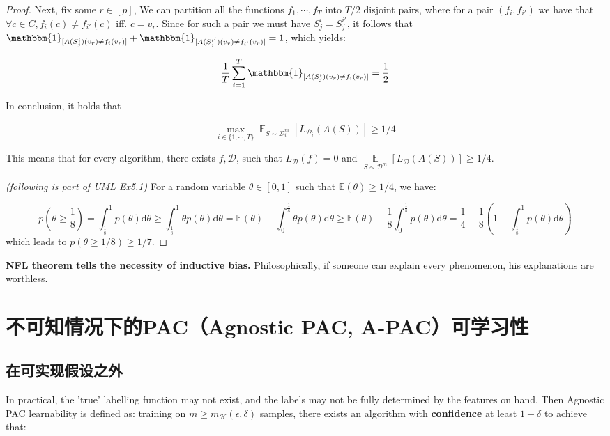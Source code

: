 \documentclass{article}
\newtheorem*{proof}{Proof}
\begin{document}
\begin{proof}
	Next, fix some $r\in[p]$, We can partition all the functions $f_1,\cdots,f_T$ into $T/2$ disjoint pairs, where for a pair $(f_i,f_{i'})$ we have that $\forall c\in C,f_i(c)\neq f_{i'}(c)$ iff. $c=v_r$. Since for such a pair we must have $S_j^i=S_j^{i'}$, it follows that $\mathbbm{1}_{[A(S_j^i)(v_r)\neq f_i(v_r)]}+\mathbbm{1}_{[A(S_j^{i'})(v_r)\neq f_{i'}(v_r)]}=1$, which yields:
	
	\begin{equation*}
	\frac{1}{T}\sum_{i=1}^T\mathbbm{1}_{[A(S_j^i)(v_r)\neq f_i(v_r)]}=\frac{1}{2}
	\end{equation*}

	In conclusion, it holds that

	\begin{equation*}
	\max_{i\in\{1,\cdots,T\}}\mathop{\mathbb{E}}_{S\sim\mathcal{D}_i^m}[L_{\mathcal{D}_i}(A(S))]\geq 1/4
	\end{equation*}

	This means that for every algorithm, there exists $f,\mathcal{D}$, such that $L_\mathcal{D}(f)=0$ and $\mathop{\mathbb{E}}\limits_{S\sim\mathcal{D}^m}[L_\mathcal{D}(A(S))]\geq 1/4$.

	\textit{(following is part of UML Ex5.1)} For a random variable $\theta\in[0,1]$ such that $\mathbb{E}(\theta)\geq 1/4$, we have:
	
	\begin{equation*}
	p\left(\theta\geq\frac{1}{8}\right)=\int_\frac{1}{8}^1 p(\theta) \mathrm{d}\theta \geq\int_\frac{1}{8}^1 \theta p(\theta) \mathrm{d}\theta=\mathbb{E}(\theta)-\int_0^\frac{1}{8}\theta p(\theta)\mathrm{d}\theta \geq\mathbb{E}(\theta)-\frac{1}{8}\int_0^\frac{1}{8} p(\theta)\mathrm{d}\theta = \frac{1}{4} - \frac{1}{8}\left( 1-\int^1_\frac{1}{8}p(\theta) \mathrm{d}\theta \right)
	\end{equation*}
which leads to $p(\theta\geq 1/8)\geq 1/7$.
	\end{proof}

	\textbf{NFL theorem tells the necessity of inductive bias.} Philosophically, if someone can explain every phenomenon, his explanations are worthless.
	
\section{不可知情况下的PAC（Agnostic PAC, A-PAC）可学习性}
	\subsection{在可实现假设之外}
	In practical, the 'true' labelling function may not exist, and the labels may not be fully determined by the features on hand. Then Agnostic PAC learnability is defined as: training on $m\geq m_\mathcal{H}(\epsilon,\delta)$ samples, there exists an algorithm with \textbf{confidence} at least $1-\delta$ to achieve that:
	
\end{document}
